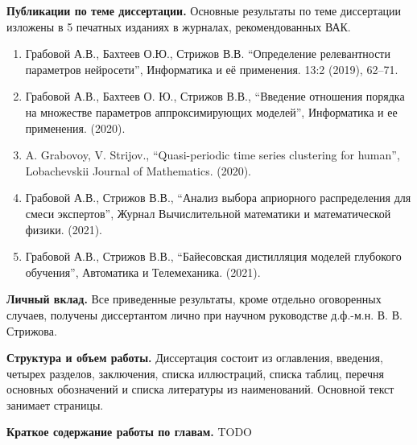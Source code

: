 \vspace{0.5cm}
\textbf{Публикации по теме диссертации.} Основные результаты по теме диссертации изложены в 5 печатных изданиях в журналах, рекомендованных ВАК.
\begin{enumerate}
\item Грабовой А.В., Бахтеев О.Ю., Стрижов В.В. ``Определение релевантности параметров нейросети'', Информатика и её применения. 13:2 (2019), 62--71.
\item Грабовой А.В., Бахтеев О. Ю., Стрижов В.В., ``Введение отношения порядка на множестве параметров аппроксимирующих моделей'', Информатика и ее применения. (2020).
\item A. Grabovoy, V. Strijov., ``Quasi-periodic time series clustering for human'', Lobachevskii Journal of Mathematics. (2020).
\item Грабовой А.В., Стрижов В.В., ``Анализ выбора априорного распределения для смеси экспертов'', Журнал Вычислительной математики и математической физики. (2021).
\item Грабовой А.В., Стрижов В.В., ``Байесовская дистилляция моделей глубокого обучения'', Автоматика и Телемеханика. (2021).
\end{enumerate}

\vspace{0.5cm}
\textbf{Личный вклад.} Все приведенные результаты, кроме отдельно оговоренных случаев, получены диссертантом лично при научном руководстве д.ф.-м.н. В. В. Стрижова.

\vspace{0.5cm}
\textbf{Структура и объем работы.} Диссертация состоит из оглавления, введения, четырех разделов, заключения, списка иллюстраций, списка таблиц, перечня основных обозначений и списка литературы из  наименований. Основной текст занимает \pageref{LastPage} страницы.

\vspace{0.5cm}
\textbf{Краткое содержание работы по главам.} TODO




